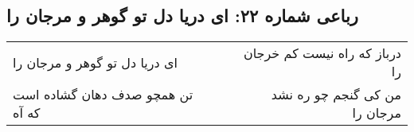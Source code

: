 \begin{center}
\section*{رباعی شماره ۲۲: ای دریا دل تو گوهر و مرجان را}
\label{sec:0022}
\begin{longtable}{l p{0.5cm} r}
ای دریا دل تو گوهر و مرجان را
&&
درباز که راه نیست کم خرجان را
\\
تن همچو صدف دهان گشاده است که آه
&&
من کی گنجم چو ره نشد مرجان را
\\
\end{longtable}
\end{center}
